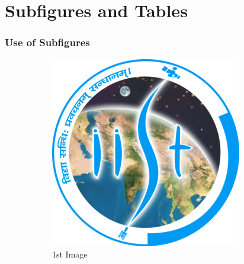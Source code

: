 \documentclass[hyperref={bookmarks=false},aspectratio=169]{beamer}
\begin{document}
\section{Subfigures and Tables}
\begin{frame}
  \frametitle{Use of Subfigures}
  \begin{figure}
    \centering
    \begin{subfigure}[b]{0.35\textwidth}
      \centering
      \includegraphics[width=\textwidth]{figures/Indian_Institute_of_Space_Science_and_Technology_Logo.png}
      \caption{1st Image}
      \label{fig:img1}
    \end{subfigure}
    \hspace{0.3cm}
    \begin{subfigure}[b]{0.35\textwidth}
      \centering

\end{subfigure}
\end{figure}
\end{frame}
\end{document}

